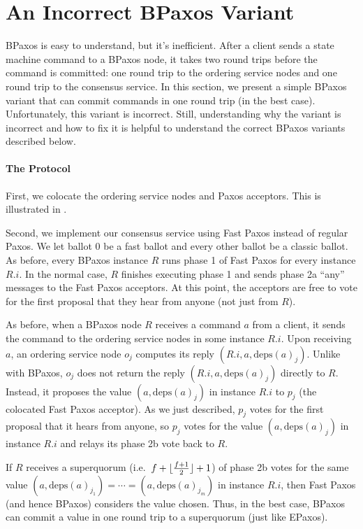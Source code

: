 \documentclass{mwhittaker}
\theoremstyle{definition}
\newcommand{\deps}[1]{\text{deps}(#1)}
\begin{document}
\section{An Incorrect BPaxos Variant}
BPaxos is easy to understand, but it's inefficient. After a client sends a
state machine command to a BPaxos node, it takes two round trips before the
command is committed: one round trip to the ordering service nodes and one
round trip to the consensus service. In this section, we present a simple
BPaxos variant that can commit commands in one round trip (in the best case).
Unfortunately, this variant is incorrect. Still, understanding why the variant
is incorrect and how to fix it is helpful to understand the correct BPaxos
variants described below.

\paragraph{The Protocol}
First, we colocate the ordering service nodes and Paxos acceptors. This is
illustrated in .

{}

Second, we implement our consensus service using Fast Paxos instead of regular
Paxos. We let ballot $0$ be a fast ballot and every other ballot be a classic
ballot. As before, every BPaxos instance $R$ runs phase 1 of Fast Paxos for
every instance $R.i$. In the normal case, $R$ finishes executing phase 1 and
sends phase 2a ``any'' messages to the Fast Paxos acceptors. At this point, the
acceptors are free to vote for the first proposal that they hear from anyone
(not just from $R$).

As before, when a BPaxos node $R$ receives a command $a$ from a client, it
sends the command to the ordering service nodes in some instance $R.i$. Upon
receiving $a$, an ordering service node $o_j$ computes its reply $(R.i, a,
\deps{a}_j)$. Unlike with BPaxos, $o_j$ does not return the reply $(R.i, a,
\deps{a}_j)$ directly to $R$. Instead, it proposes the value $(a, \deps{a}_j)$
in instance $R.i$ to $p_j$ (the colocated Fast Paxos acceptor). As we just
described, $p_j$ votes for the first proposal that it hears from anyone, so
$p_j$ votes for the value $(a, \deps{a}_j)$ in instance $R.i$ and relays its
phase 2b vote back to $R$.

If $R$ receives a superquorum (i.e.\ $f + \lfloor\frac{f+1}{2}\rfloor + 1$) of phase
2b votes for the same value $(a, \deps{a}_{j_1}) = \cdots = (a,
\deps{a}_{j_{m}})$ in instance $R.i$, then Fast Paxos (and hence BPaxos)
considers the value chosen. Thus, in the best case, BPaxos can commit a value
in one round trip to a superquorum (just like EPaxos).
\end{document}
